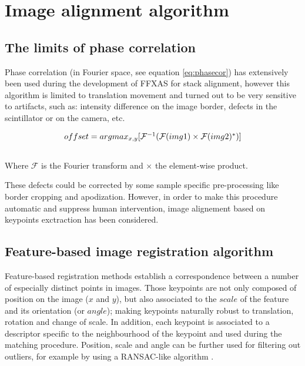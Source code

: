 \documentclass[preprint]{iucr}
\begin{document}
\section{Image alignment algorithm}

\subsection{The limits of phase correlation}

Phase correlation (in Fourier space, see equation \ref{eq:phasecor}) has
extensively been used during the development of FFXAS for stack alignment, however this algorithm is limited to
translation movement and turned out to be very sensitive to artifacts, such as:
intensity difference on the image border, defects in the scintillator or on
the camera, etc.

\begin{center}
\begin{equation}
\label{eq:phasecor}
$$offset =
argmax_{x,y}[\mathcal{F}^{-1}(\mathcal{F}(img1)\times\mathcal{F}(img2)^*)]$$
\end{equation}
\\Where $\mathcal{F}$ is the Fourier transform and $\times$ the element-wise
product.
\end{center}

These defects could be corrected by some sample
specific pre-processing like border cropping and apodization.
However, in order to make this procedure automatic and suppress human
intervention, image alignement based on keypoints exctraction has been
considered.

\subsection{Feature-based image registration algorithm}

Feature-based registration methods establish a correspondence between a
number of especially distinct points in images.
Those keypoints are not only composed of position on the image ($x$ and $y$),
but also associated to the $scale$ of the feature and its
orientation (or $angle$);
making keypoints naturally robust to
translation, rotation and change of scale.
In addition, each keypoint is associated to a descriptor specific to the
neighbourhood of the keypoint and used during the matching procedure. Position,
scale and angle can be further used for filtering out outliers, for example by
using a RANSAC-like algorithm \cite{orsa}.
\end{document}
